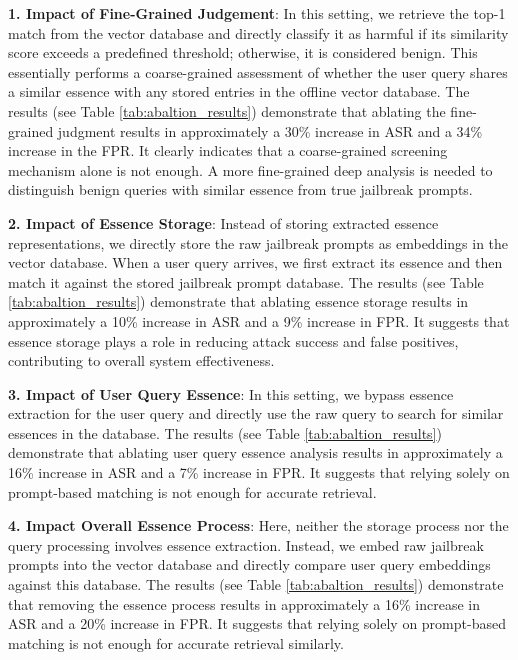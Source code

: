 \textbf{1. Impact of Fine-Grained Judgement}: In this setting, we retrieve the top-1 match from the vector database and directly classify it as harmful if its similarity score exceeds a predefined threshold; otherwise, it is considered benign. This essentially performs a coarse-grained assessment of whether the user query shares a similar essence with any stored entries in the offline vector database. The results (see Table \ref{tab:abaltion_results}) demonstrate that ablating the fine-grained judgment results in approximately a 30\% increase in ASR and a 34\% increase in the FPR. It clearly indicates that a coarse-grained screening mechanism alone is not enough. A more fine-grained deep analysis is needed to distinguish benign queries with similar essence from true jailbreak prompts.

\textbf{2. Impact of Essence Storage}: Instead of storing extracted essence representations, we directly store the raw jailbreak prompts as embeddings in the vector database. When a user query arrives, we first extract its essence and then match it against the stored jailbreak prompt database. The results (see Table \ref{tab:abaltion_results}) demonstrate that ablating essence storage results in approximately a 10\% increase in ASR and a 9\% increase in FPR. It suggests that essence storage plays a role in reducing attack success and false positives, contributing to overall system effectiveness.

\textbf{3. Impact of User Query Essence}: In this setting, we bypass essence extraction for the user query and directly use the raw query to search for similar essences in the database. The results (see Table \ref{tab:abaltion_results}) demonstrate that ablating user query essence analysis results in approximately a 16\% increase in ASR and a 7\% increase in FPR. It suggests that relying solely on prompt-based matching is not enough for accurate retrieval.

\textbf{4. Impact Overall Essence Process}: Here, neither the storage process nor the query processing involves essence extraction. Instead, we embed raw jailbreak prompts into the vector database and directly compare user query embeddings against this database. The results (see Table \ref{tab:abaltion_results}) demonstrate that removing the essence process results in approximately a 16\% increase in ASR and a 20\% increase in FPR. It suggests that relying solely on prompt-based matching is not enough for accurate retrieval similarly.


